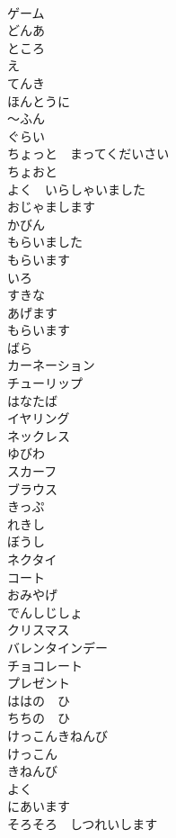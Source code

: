 \documentclass[8pt]{extreport}
\begin{document}
\begin{CJK}{UTF8}{min}
\\	ゲーム		
\\	どんあ		
\\	ところ		
\\	え		
\\	てんき		
\\	ほんとうに		
\\	〜ふん		
\\	ぐらい		
\\	ちょっと　まってくだいさい		
\\	ちょおと		
\\	よく　いらしゃいました		
\\	おじゃまします		
\\	かびん		
\\	もらいました		
\\	もらいます		
\\	いろ		
\\	すきな		
\\	あげます		
\\	もらいます		
\\	ばら		
\\	カーネーション		
\\	チューリップ		
\\	はなたば		
\\	イヤリング		
\\	ネックレス		
\\	ゆびわ		
\\	スカーフ		
\\	ブラウス		
\\	きっぷ		
\\	れきし		
\\	ぼうし		
\\	ネクタイ		
\\	コート		
\\	おみやげ		
\\	でんしじしょ		
\\	クリスマス		
\\	バレンタインデー		
\\	チョコレート		
\\	プレゼント		
\\	ははの　ひ		
\\	ちちの　ひ		
\\	けっこんきねんび		
\\	けっこん		
\\	きねんび		
\\	よく		
\\	にあいます		
\\	そろそろ　しつれいします		

\end{CJK}
\end{document}
